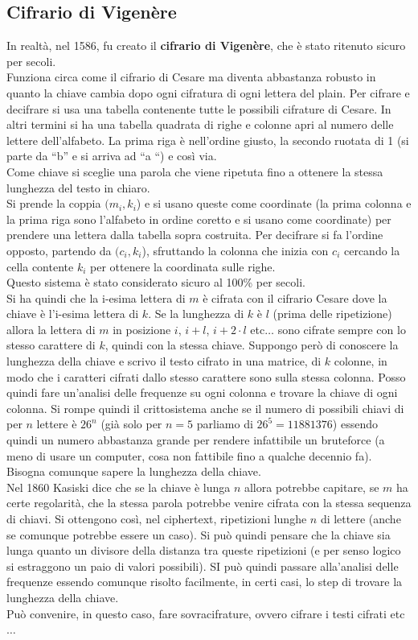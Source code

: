 \documentclass[a4paper,12pt, oneside]{book}
\begin{document}
\subsection{Cifrario di Vigenère}
In realtà, nel 1586, fu creato il \textbf{cifrario di Vigenère}, che è stato
ritenuto sicuro per secoli.\\
Funziona circa come il cifrario di Cesare ma diventa abbastanza robusto in
quanto la chiave cambia dopo ogni cifratura di ogni lettera del plain. Per
cifrare e decifrare si usa una tabella contenente tutte le possibili cifrature
di Cesare. In altri termini si ha una tabella quadrata di righe e colonne apri
al numero delle lettere dell'alfabeto. La prima riga è nell'ordine giusto, la
secondo ruotata di 1 (si parte da ``b'' e si arriva ad ``a ``) e così via.\\
Come chiave si sceglie una parola che viene ripetuta fino a ottenere la stessa
lunghezza del testo in chiaro.\\
Si prende la coppia $(m_i,k_i$) e si usano queste come coordinate (la prima
colonna e la prima riga sono l'alfabeto in ordine coretto e si usano come
coordinate) per prendere una lettera dalla tabella sopra costruita. Per
decifrare si fa l'ordine opposto, partendo da $(c_i, k_i$), sfruttando la
colonna che inizia con $c_i$ cercando la cella contente $k_i$ per ottenere la
coordinata sulle righe.\\
Questo sistema è stato considerato sicuro al 100\% per secoli.\\
Si ha quindi che la i-esima lettera di $m$ è cifrata con il cifrario Cesare dove
la chiave è l'i-esima lettera di $k$.
Se la lunghezza di $k$ è $l$ (prima delle ripetizione) allora la lettera di $m$
in posizione $i$, $i+l$, $i+2\cdot l$ etc$\ldots$ sono cifrate sempre con lo
stesso carattere di $k$, quindi con la stessa chiave. Suppongo però di conoscere
la lunghezza della chiave e scrivo il testo cifrato in una matrice, di $k$
colonne, in modo che i caratteri cifrati dallo stesso carattere sono sulla
stessa colonna. Posso quindi fare un'analisi delle frequenze su ogni colonna e
trovare la chiave di ogni colonna. Si rompe quindi il crittosistema anche se il
numero di possibili chiavi di per $n$ lettere è $26^n$ (già solo per $n=5$
parliamo di $26^5=11881376$) essendo quindi un numero abbastanza grande per
rendere infattibile un bruteforce (a meno di usare un computer, cosa non
fattibile fino a qualche decennio fa). Bisogna comunque sapere la lunghezza
della chiave.\\
Nel 1860 Kasiski dice che se la chiave è lunga $n$ allora potrebbe capitare, se
$m$ ha certe regolarità, che la stessa parola potrebbe venire cifrata con la
stessa sequenza di chiavi. Si ottengono così, nel ciphertext, ripetizioni
lunghe $n$ di lettere (anche se comunque potrebbe essere un caso). Si può quindi
pensare che la chiave sia lunga quanto un divisore della distanza tra queste
ripetizioni (e per senso logico si estraggono un paio di valori possibili). SI
può quindi passare alla'analisi delle frequenze essendo comunque risolto
facilmente, in certi casi, lo step di trovare la lunghezza della chiave.\\
Può convenire, in questo caso, fare sovracifrature, ovvero cifrare i testi
cifrati etc$\ldots$ 
\end{document}
